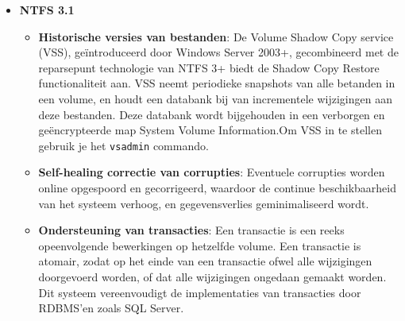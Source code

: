 \begin{enumerate}
{\begin{itemize}
\begin{itemize}
						\item \textbf{Sparse bestanden}: Indien een bestand sparse is, kan NTFS enkel schijfruimte toewijzen aan de delen van grote bestanden waarnaar effecties wordt geschreven. Om een bestand als sparse te markeren, moet je het commando \texttt{fsutil sparse setflag \emph{bestandsnaam}} gebruiken. 
						\item \textbf{File markers voor Remote Storage Service}: 
						\item \textbf{Transparante encryptie en decodering}:  (\texttt{cipher /e /a /s:...})
						\item \textbf{Individuele diskquota op volumeniveau}: Voor elke gebruiker kan er een diskquota op volumeniveau ingesteld worden, zodat er een  maximale beschikbare opslagcapaciteit voor die gebruiker in een specifiek volume is. Om quotabeheer in te schakelen op een specifiek volume gebruik je het commando \texttt{fsutil quota enforce \emph{volumenaam}}. Om na te gaan of er gebruikers over de limiet zitten, gebruik je het commando \texttt{fsutil quota violations}. Informatie over het gebruik van volumes wordt geregistreerd per security ID en niet per accountnaam.
					\end{itemize}
				\item \textbf{NTFS 3.1}
					\begin{itemize}
						\item \textbf{Historische versies van bestanden}: De Volume Shadow Copy service (VSS), geïntroduceerd door Windows Server 2003+, gecombineerd met de reparsepunt technologie van NTFS 3+ biedt de Shadow Copy Restore functionaliteit aan. VSS neemt periodieke snapshots van alle betanden in een volume, en houdt een databank bij van incrementele wijzigingen aan deze bestanden. Deze databank wordt bijgehouden in een verborgen en geëncrypteerde map System Volume Information.Om VSS in te stellen gebruik je het \texttt{vsadmin} commando.
						\item \textbf{Self-healing correctie van corrupties}: Eventuele corrupties worden online opgespoord en gecorrigeerd, waardoor de continue beschikbaarheid van het systeem verhoog, en gegevensverlies geminimaliseerd wordt.
						\item \textbf{Ondersteuning van transacties}: Een transactie is een reeks opeenvolgende bewerkingen op hetzelfde volume. Een transactie is atomair, zodat op het einde van een transactie ofwel alle wijzigingen doorgevoerd worden, of dat alle wijzigingen ongedaan gemaakt worden. Dit systeem vereenvoudigt de implementaties van transacties door RDBMS'en zoals SQL Server. 

\end{itemize}
\end{itemize}}
\end{enumerate}
